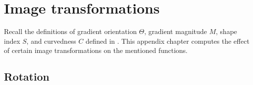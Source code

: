 \documentclass[thesis.tex]{subfiles}
\begin{document}
%
\chapter{Image transformations} \label{apx:image_transformations}

Recall the definitions of gradient orientation $\Theta$, gradient magnitude $M$, shape index $S$, and curvedness $C$ defined in .
This appendix chapter computes the effect of certain image transformations on the mentioned functions.

\section{Rotation} \label{apx:rotation}
\end{document}
